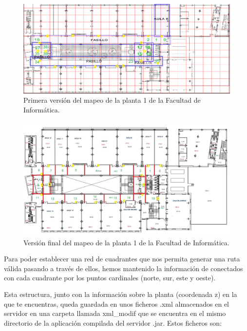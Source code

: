 \begin{figure}[t]
	\centering
	\includegraphics[width=1\textwidth]{Imagenes/Descripciondeltrabajo/mapaplanta1_cuadrantes}
	\caption{Primera versión del mapeo de la planta 1 de la Facultad de Informática.}
	\label{fig:cuadrantesP1_v1}
\end{figure}

\begin{figure}[t]
	\centering
	\includegraphics[width=1\textwidth]{Imagenes/Descripciondeltrabajo/mapaplanta1_cuadrantes3}
	\caption{Versión final del mapeo de la planta 1 de la Facultad de Informática.}
	\label{fig:cuadrantesP1_v3}
\end{figure}

Para poder establecer una red de cuadrantes que nos permita generar una ruta válida pasando a través de ellos, hemos mantenido la información de conectados con cada cuadrante por los puntos cardinales (norte, sur, este y oeste).

Esta estructura, junto con la información sobre la planta (coordenada z) en la que te encuentras, queda guardada en unos ficheros .xml almacenados en el servidor en una carpeta llamada xml\_modif que se encuentra en el mismo directorio de la aplicación compilada del servidor .jar. Estos ficheros son:

